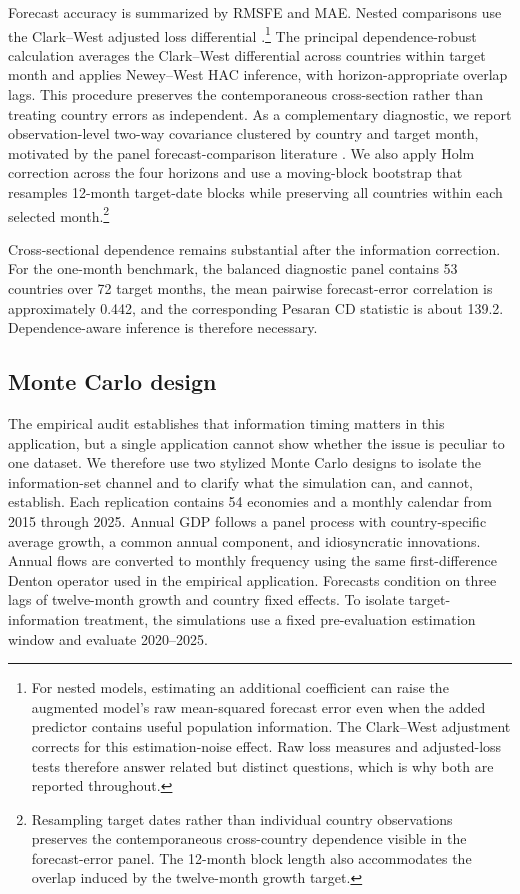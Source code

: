 \documentclass[preprint,12pt,authoryear]{elsarticle}
\begin{document}
Forecast accuracy is summarized by RMSFE and MAE. Nested comparisons use the Clark--West adjusted loss differential \citep{clarkwest2007}.\footnote{For nested models, estimating an additional coefficient can raise the augmented model's raw mean-squared forecast error even when the added predictor contains useful population information. The Clark--West adjustment corrects for this estimation-noise effect. Raw loss measures and adjusted-loss tests therefore answer related but distinct questions, which is why both are reported throughout.} The principal dependence-robust calculation averages the Clark--West differential across countries within target month and applies Newey--West HAC inference, with horizon-appropriate overlap lags. This procedure preserves the contemporaneous cross-section rather than treating country errors as independent. As a complementary diagnostic, we report observation-level two-way covariance clustered by country and target month, motivated by the panel forecast-comparison literature \citep{qu2024,akgun2024,coroneo2025}. We also apply Holm correction across the four horizons and use a moving-block bootstrap that resamples 12-month target-date blocks while preserving all countries within each selected month.\footnote{Resampling target dates rather than individual country observations preserves the contemporaneous cross-country dependence visible in the forecast-error panel. The 12-month block length also accommodates the overlap induced by the twelve-month growth target.}

Cross-sectional dependence remains substantial after the information correction. For the one-month benchmark, the balanced diagnostic panel contains 53 countries over 72 target months, the mean pairwise forecast-error correlation is approximately 0.442, and the corresponding Pesaran CD statistic is about 139.2. Dependence-aware inference is therefore necessary.

\subsection{Monte Carlo design}
The empirical audit establishes that information timing matters in this application, but a single application cannot show whether the issue is peculiar to one dataset. We therefore use two stylized Monte Carlo designs to isolate the information-set channel and to clarify what the simulation can, and cannot, establish. Each replication contains 54 economies and a monthly calendar from 2015 through 2025. Annual GDP follows a panel process with country-specific average growth, a common annual component, and idiosyncratic innovations. Annual flows are converted to monthly frequency using the same first-difference Denton operator used in the empirical application. Forecasts condition on three lags of twelve-month growth and country fixed effects. To isolate target-information treatment, the simulations use a fixed pre-evaluation estimation window and evaluate 2020--2025.
\end{document}
